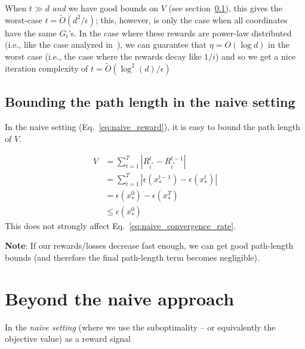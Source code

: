 \documentclass[letterpaper]{article}
\newcommand{\istar}{i^*}
\begin{document}
When $t \gg d$ \emph{and} we have good bounds on $V$ (see section~\ref{section:naive_bounding_path_length}), this gives the worst-case $t = \tilde{O}(d^2/\epsilon)$; this, however, is only the case when all coordinates have the same $G_i$'s. In the case where these rewards are power-law distributed (i.e., like the case analyzed in~\cite{namkoong2017adaptive}), we can guarantee that $\eta = O(\log d)$ in the worst case (i.e., the case where the rewards decay like $1/i$) and so we get a nice iteration complexity of $t = \tilde{O}(\log^2(d) / \epsilon)$

\subsection{Bounding the path length in the naive setting}
\label{section:naive_bounding_path_length}
In the naive setting (Eq.~\ref{eq:naive_reward}), it is easy to bound the path length of $V$. 

\begin{align}
    V &= \sum_{t=1}^T |R_{\istar}^t - R_{\istar}^{t-1}| \\
    &= \sum_{t=1}^T |\epsilon(x^{t-1}_*)-\epsilon(x^t_*)| \\
    &= \epsilon(x^0_*) - \epsilon(x^T_*)\\
    &\leq \epsilon(x^0_*)
\end{align}
This does not strongly affect Eq.~\ref{eq:naive_convergence_rate}.

\textbf{Note}: If our rewards/losses decrease fast enough, we can get good path-length bounds (and therefore the final path-length term becomes negligible).

\section{Beyond the naive approach}
In the \emph{naive setting} (where we use the suboptimality -- or equivalently the objective value) as a reward signal





\end{document}

